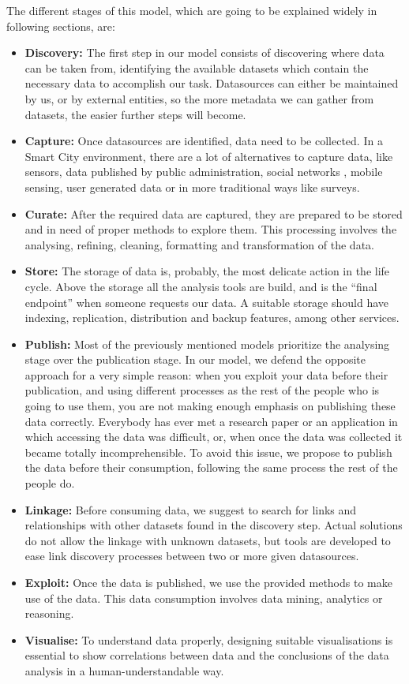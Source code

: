 The different stages of this model, which are going to be explained widely in following sections, are:
\begin{itemize}
	\item \textbf{Discovery:} The first step in our model consists of discovering where data can be taken from, identifying the available datasets which contain the necessary data to accomplish our task. Datasources can either be maintained by us, or by external entities, so the more metadata we can gather from datasets, the easier further steps will become. 
    \item \textbf{Capture:} Once datasources are identified, data need to be collected. In a Smart City environment, there are a lot of alternatives to capture data, like sensors,  data published by public administration, social networks , mobile sensing, user generated data or in more traditional ways like surveys.
    \item \textbf{Curate:} After the required data are captured, they are prepared to be stored and in need of proper methods to explore them. This processing involves the analysing, refining, cleaning, formatting and transformation of the data.
    \item \textbf{Store:} The storage of data is, probably, the most delicate action in the life cycle. Above the storage  all the analysis tools are build, and is the ``final endpoint'' when someone requests our data. A suitable storage should have indexing, replication, distribution and backup features, among other services.
    \item \textbf{Publish:} Most of the previously mentioned models prioritize the analysing stage over the publication stage. In our model, we defend the opposite approach for a very simple reason: when you exploit your data before their publication, and using different processes as the rest of the people who is going to use them, you are not making enough emphasis on publishing these data correctly. Everybody has ever met a research paper or an application in which accessing the data was difficult, or, when once the data was collected it became totally incomprehensible. To avoid this issue, we propose to publish the data before their consumption, following the same process the rest of the people do.
    \item \textbf{Linkage:} Before consuming data, we suggest to search for links and relationships with other datasets found in the discovery step. Actual solutions do not allow the linkage with unknown datasets, but tools are developed to ease link discovery processes between two or more given datasources.
    \item \textbf{Exploit:} Once the data is published, we use the provided methods to make use of the data. This data consumption involves data mining, analytics or reasoning.
    \item \textbf{Visualise:} To understand data properly, designing suitable visualisations is essential to show correlations between data and the conclusions of the data analysis in a human-understandable way. 

\end{itemize}

